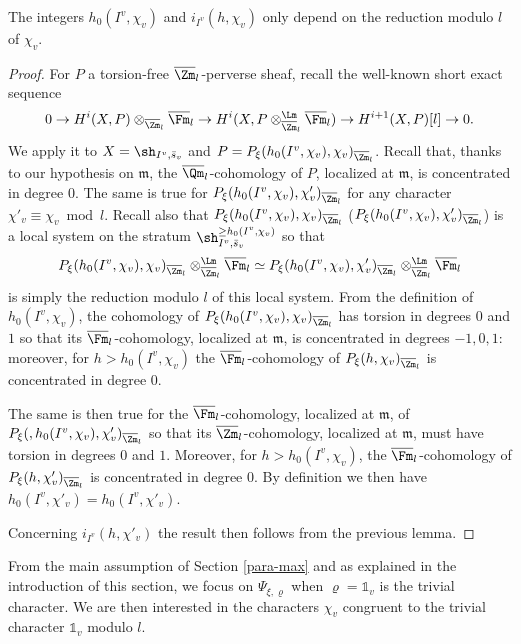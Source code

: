 \begin{lemma} \label{lem-h0I}
The integers $h_0(I^v,\chi_v)$ and $i_{I^v}(h,\chi_v)$ only depend on the reduction modulo $l$ of $\chi_v$.
\end{lemma}

\begin{proof}
For $P$ a torsion-free $\overline \Zm_l$-perverse sheaf,
recall the well-known short exact sequence
\[
0 \to H^i(X,P) \otimes_{\overline \Zm_l} \overline \Fm_l \to
H^i(X,P \otimes^\Lm_{\overline \Zm_l} \overline \Fm_l) \to
H^{i+1}(X,P)[l] \to 0.
\]
We apply it to $X=\sh_{I^v,\bar s_v}$ and $P=P_\xi(h_0(I^v,\chi_v),\chi_{v})_{\overline \Zm_l}$.
Recall that, thanks to our hypothesis on $\mathfrak m$,
the $\overline \Qm_l$-cohomology of $P$, localized at $\mathfrak m$,
is concentrated in degree $0$.
The same is true for $P_\xi(h_0(I^v,\chi_v),\chi'_{v})_{\overline \Zm_l}$ for any character
$\chi'_v \equiv \chi_v \bmod l$. Recall also that $P_\xi(h_0(I^v,\chi_v),\chi_{v})_{\overline \Zm_l}$
(\resp $P_\xi(h_0(I^v,\chi_v),\chi'_{v})_{\overline \Zm_l}$) is a local system on the stratum
$\sh_{I^v,\bar s_v}^{\geq h_0(I^v,\chi_v)}$ so that
\[
P_\xi(h_0(I^v,\chi_v),\chi_{v})_{\overline \Zm_l} \otimes^\Lm_{\overline \Zm_l} \overline \Fm_l
\simeq P_\xi(h_0(I^v,\chi_v),\chi'_{v})_{\overline \Zm_l} \otimes^\Lm_{\overline \Zm_l} \overline \Fm_l
\]
is simply the reduction modulo $l$ of this local system.
From the definition of $h_0(I^v,\chi_v)$, the cohomology of
$P_\xi(h_0(I^v,\chi_v),\chi_{v})_{\overline \Zm_l}$ has torsion in degrees $0$ and $1$
so that its $\overline \Fm_l$-cohomology, localized at $\mathfrak m$, is
concentrated in degrees $-1,0,1$: moreover, for $h> h_0(I^v,\chi_v)$ the
$\overline \Fm_l$-cohomology of $P_\xi(h,\chi_v)_{\overline \Zm_l}$ is concentrated in degree $0$.

The same is then true for the $\overline \Fm_l$-cohomology,
localized at $\mathfrak m$, of $P_\xi(,h_0(I^v,\chi_v),\chi'_{v})_{\overline \Zm_l}$
so that its $\overline \Zm_l$-cohomology, localized at $\mathfrak m$, must have
torsion in degrees $0$ and $1$. Moreover, for $h>h_0(I^v,\chi_v)$,
the $\overline \Fm_l$-cohomology of $P_\xi(h,\chi'_v)_{\overline \Zm_l}$ is concentrated
in degree $0$. By definition we then have $h_0(I^v,\chi'_v)=h_0(I^v,\chi'_v)$.

Concerning $i_{I^v}(h,\chi'_v)$ the result then follows from the previous lemma.
\end{proof}

From the main assumption of Section \ref{para-max} and as explained in the introduction of
this section, we focus on $\Psi_{\xi,\varrho}$ when $\varrho=\mathds 1_v$
is the trivial character. We are then interested in the characters $\chi_v$
congruent to the trivial character $\mathds 1_v$ modulo $l$.

